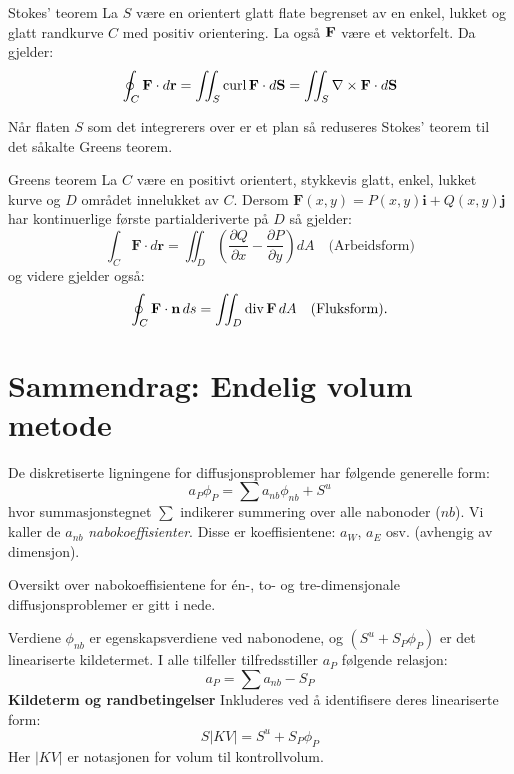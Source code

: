 \begin{oppsum}{Stokes' teorem}
La $S$ være en orientert glatt flate begrenset av en enkel, lukket og glatt randkurve $C$ med positiv orientering. La også $\mathbf{F}$ være et vektorfelt. Da gjelder:
\[
\oint_C \mathbf{F} \cdot d\mathbf{r} =\iint_S \operatorname{curl} \mathbf{F} \cdot d\mathbf{S} = \iint_S \nabla \times \mathbf{F} \cdot d\mathbf{S}
\]  
\end{oppsum}
Når flaten $S$ som det integrerers over er et plan så reduseres Stokes' teorem til det såkalte Greens teorem.
\begin{oppsum}{Greens teorem}
La \( C \) være en positivt orientert, stykkevis glatt, enkel, lukket kurve og \( D \) området innelukket av \( C \). Dersom \( \mathbf{F}(x,y) = P(x,y)\mathbf{i} + Q(x,y) \mathbf{j} \) har kontinuerlige første partialderiverte på \( D \) så gjelder:
\[
\int_C \mathbf{F} \cdot d\mathbf{r} = \iint_D \left( \frac{\partial Q}{\partial x} - \frac{\partial P}{\partial y} \right) dA \quad \text{(Arbeidsform)}
\]
og videre gjelder også:
\[
\oint_{C} \mathbf{F} \cdot \mathbf{n} \, ds = \iint_D \operatorname{div} \mathbf{F} \, dA \quad \text{(Fluksform)}.
\]
\end{oppsum}

\newpage
\section{Sammendrag: Endelig volum metode}\label{app:EV:sammendrag}
De diskretiserte ligningene for diffusjonsproblemer har følgende generelle form:
\[
a_P \phi_P = \sum a_{nb} \phi_{nb} + S^u
\]
hvor summasjonstegnet $\sum$ indikerer summering over alle nabonoder ($nb$). Vi kaller de $a_{nb}$ \emph{nabokoeffisienter}. Disse er koeffisientene: $a_W$, $a_E$ osv. (avhengig av dimensjon). 

Oversikt over nabokoeffisientene for én-, to- og tre-dimensjonale diffusjonsproblemer er gitt i  nede. 

Verdiene $\phi_{nb}$ er egenskapsverdiene ved nabonodene, og $(S^u + S_P \phi_P)$ er det lineariserte kildetermet.
I alle tilfeller tilfredsstiller $a_P$ følgende relasjon:
\[
a_P = \sum a_{nb} - S_P
\]
\textbf{Kildeterm og randbetingelser}
Inkluderes ved å identifisere deres lineariserte form:
\[
S |KV| = S^u + S_P \phi_P
\]
Her $|KV|$ er notasjonen for volum til kontrollvolum.

